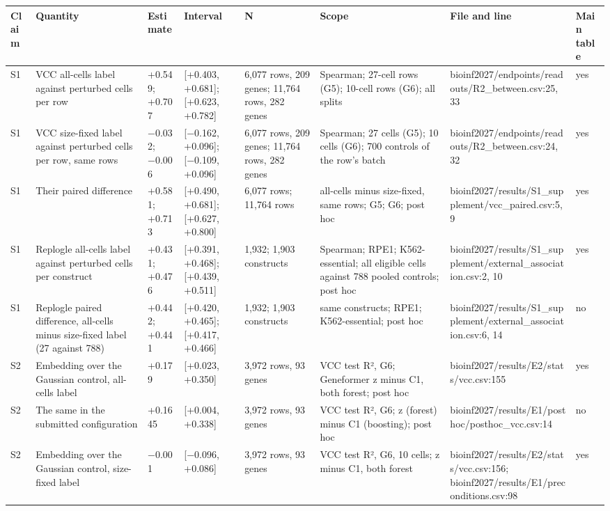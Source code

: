 \begin{tabular}{llllllll}
\toprule
Claim & Quantity & Estimate & Interval & N & Scope & File and line & Main table \\
\midrule
S1 & VCC all-cells label against perturbed cells per row & +0.549; +0.707 & [+0.403, +0.681]; [+0.623, +0.782] & 6,077 rows, 209 genes; 11,764 rows, 282 genes & Spearman; 27-cell rows (G5); 10-cell rows (G6); all splits & bioinf2027/endpoints/readouts/R2\_between.csv:25, 33 & yes \\
S1 & VCC size-fixed label against perturbed cells per row, same rows & −0.032; −0.006 & [−0.162, +0.096]; [−0.109, +0.096] & 6,077 rows, 209 genes; 11,764 rows, 282 genes & Spearman; 27 cells (G5); 10 cells (G6); 700 controls of the row's batch & bioinf2027/endpoints/readouts/R2\_between.csv:24, 32 & yes \\
S1 & Their paired difference & +0.581; +0.713 & [+0.490, +0.681]; [+0.627, +0.800] & 6,077 rows; 11,764 rows & all-cells minus size-fixed, same rows; G5; G6; post hoc & bioinf2027/results/S1\_supplement/vcc\_paired.csv:5, 9 & yes \\
S1 & Replogle all-cells label against perturbed cells per construct & +0.431; +0.476 & [+0.391, +0.468]; [+0.439, +0.511] & 1,932; 1,903 constructs & Spearman; RPE1; K562-essential; all eligible cells against 788 pooled controls; post hoc & bioinf2027/results/S1\_supplement/external\_association.csv:2, 10 & yes \\
S1 & Replogle paired difference, all-cells minus size-fixed label (27 against 788) & +0.442; +0.441 & [+0.420, +0.465]; [+0.417, +0.466] & 1,932; 1,903 constructs & same constructs; RPE1; K562-essential; post hoc & bioinf2027/results/S1\_supplement/external\_association.csv:6, 14 & no \\
S2 & Embedding over the Gaussian control, all-cells label & +0.179 & [+0.023, +0.350] & 3,972 rows, 93 genes & VCC test R², G6; Geneformer z minus C1, both forest; post hoc & bioinf2027/results/E2/stats/vcc.csv:155 & yes \\
S2 & The same in the submitted configuration & +0.1645 & [+0.004, +0.338] & 3,972 rows, 93 genes & VCC test R², G6; z (forest) minus C1 (boosting); post hoc & bioinf2027/results/E1/posthoc/posthoc\_vcc.csv:14 & no \\
S2 & Embedding over the Gaussian control, size-fixed label & −0.001 & [−0.096, +0.086] & 3,972 rows, 93 genes & VCC test R², G6, 10 cells; z minus C1, both forest & bioinf2027/results/E2/stats/vcc.csv:156; bioinf2027/results/E1/preconditions.csv:98 & yes \\

\end{tabular}
